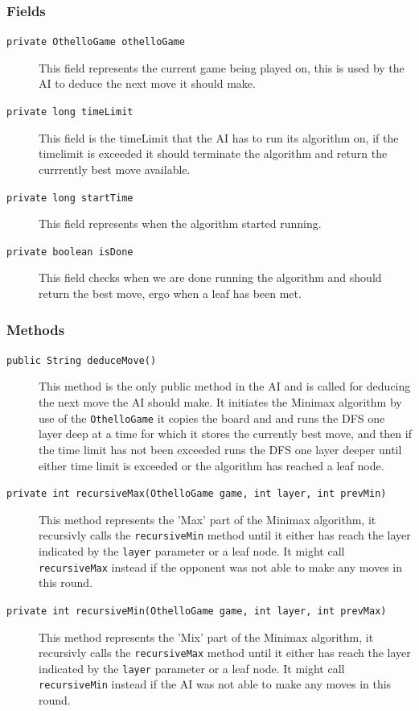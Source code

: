 \documentclass[a4paper]{article}
\begin{document}
\subsubsection{Fields}
\begin{description}
\item[\texttt{private OthelloGame othelloGame}] This field represents the current game being played on, this is used by the AI to deduce the next move it should make. 
\item[\texttt{private long timeLimit}] This field is the timeLimit that the AI has to run its algorithm on, if the timelimit is exceeded it should terminate the algorithm and return the currrently best move available.
\item[\texttt{private long startTime}] This field represents when the algorithm started running.
\item[\texttt{private boolean isDone}] This field checks when we are done running the algorithm and should return the best move, ergo when a leaf has been met.
\end{description} 




\subsubsection{Methods}
\begin{description}
\item[\texttt{public String deduceMove()}] This method is the only public method in the AI and is called for deducing the next move the AI should make. It initiates the Minimax algorithm by use of the \texttt{OthelloGame} it copies the board and and runs the DFS one layer deep at a time for which it stores the currently best move, and then if the time limit has not been exceeded runs the DFS one layer deeper until either time limit is exceeded or the algorithm has reached a leaf node.
\item[\texttt{private int recursiveMax(OthelloGame game, int layer, int prevMin)}] This method represents the 'Max' part of the Minimax algorithm, it recursivly calls the \texttt{recursiveMin} method until it either has reach the layer indicated by the \texttt{layer} parameter or a leaf node. It might call \texttt{recursiveMax} instead if the opponent was not able to make any moves in this round.
\item[\texttt{private int recursiveMin(OthelloGame game, int layer, int prevMax)}] This method represents the 'Mix' part of the Minimax algorithm, it recursivly calls the \texttt{recursiveMax} method until it either has reach the layer indicated by the \texttt{layer} parameter or a leaf node. It might call \texttt{recursiveMin} instead if the AI was not able to make any moves in this round.
\end{description} 
\end{document}
